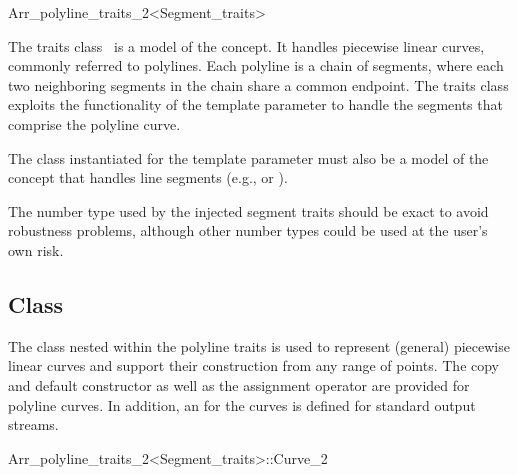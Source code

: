 \ccRefPageBegin
\begin{ccRefClass}{Arr_polyline_traits_2<Segment_traits>}

\ccDefinition

  The traits class \ccRefName\ is a model of the 
  concept. It handles piecewise linear curves, commonly referred to polylines.
  Each polyline is a chain of segments, where each two neighboring segments
  in the chain share a common endpoint. The traits class exploits the
  functionality of the  template parameter to handle the
  segments that comprise the polyline curve.

  The class instantiated for the template parameter  must
  also be a model of the  concept that handles line
  segments (e.g.,  or 
  ).

  The number type used by the injected segment traits should be exact to avoid
  robustness problems, although other number types could be used at the user's
  own risk.


\ccIsModel
   

\subsection*{Class }

The  class nested within the polyline traits is used to
represent (general) piecewise linear curves and support their construction
from any range of points. The copy and default constructor as well as 
the assignment operator are provided for polyline curves. In addition, 
an  for the curves is defined for standard output streams.

\begin{ccClass}{Arr_polyline_traits_2<Segment_traits>::Curve_2}

\ccTypes



\end{ccClass}
\end{ccRefClass}
